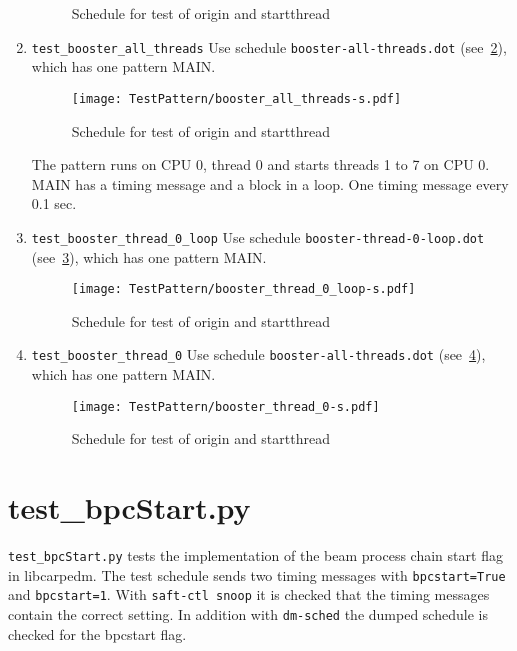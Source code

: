 \documentclass[12pt,a4paper]{report}
\begin{document}
\begin{enumerate}
\begin{figure}
        \caption{Schedule for test of origin and startthread}
        \label{fig:Schedule_booster_startthread-3}
    \end{figure}
\item \texttt{test\_booster\_all\_threads}
Use schedule \texttt{booster-all-threads.dot} (see~\ref{fig:Schedule_booster_all_threads}),
which has one pattern MAIN.
    \begin{figure}
        \centering
        \texttt{[image: TestPattern/booster\_all\_threads-s.pdf]}
        \caption{Schedule for test of origin and startthread}
        \label{fig:Schedule_booster_all_threads}
    \end{figure}
The pattern runs on CPU 0, thread 0 and starts threads 1 to 7 on CPU 0.
MAIN has a timing message and a block in a loop. One timing message every 0.1 sec.
\item \texttt{test\_booster\_thread\_0\_loop}
Use schedule \texttt{booster-thread-0-loop.dot} (see~\ref{fig:Schedule_booster_thread_0_loop}),
which has one pattern MAIN.
    \begin{figure}
        \centering
        \texttt{[image: TestPattern/booster\_thread\_0\_loop-s.pdf]}
        \caption{Schedule for test of origin and startthread}
        \label{fig:Schedule_booster_thread_0_loop}
    \end{figure}
\item \texttt{test\_booster\_thread\_0}
Use schedule \texttt{booster-all-threads.dot} (see~\ref{fig:Schedule_booster_thread_0}),
which has one pattern MAIN.
    \begin{figure}
        \centering
        \texttt{[image: TestPattern/booster\_thread\_0-s.pdf]}
        \caption{Schedule for test of origin and startthread}
        \label{fig:Schedule_booster_thread_0}
    \end{figure}
\end{enumerate}

\section{test\_bpcStart.py}
\texttt{test\_bpcStart.py} tests the implementation of the beam process chain start flag in libcarpedm.
The test schedule sends two timing messages with \texttt{bpcstart=True} and \texttt{bpcstart=1}.
With \texttt{saft-ctl snoop} it is checked that the timing messages contain the correct setting.
In addition with \texttt{dm-sched} the dumped schedule is checked for the bpcstart flag.
\end{document}
